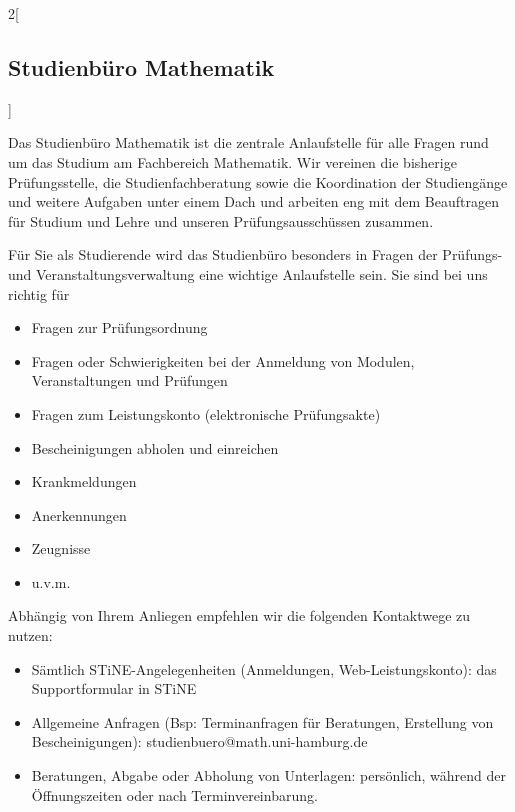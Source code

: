 \begin{multicols}{2}[\subsection{Studienbüro Mathematik}]

Das Studienbüro Mathematik ist die zentrale Anlaufstelle für alle Fragen rund
um das Studium am Fachbereich Mathematik. Wir vereinen die bisherige
Prüfungsstelle, die Studienfachberatung sowie die Koordination der Studiengänge
und weitere Aufgaben unter einem Dach und arbeiten eng mit dem Beauftragen für
Studium und Lehre und unseren Prüfungsausschüssen zusammen. 

Für Sie als Studierende wird das Studienbüro besonders in Fragen der Prüfungs-
und Veranstaltungsverwaltung eine wichtige Anlaufstelle sein. Sie sind bei uns
richtig für

\begin{itemize}\itemsep 0pt
    \item Fragen zur Prüfungsordnung 
    \item Fragen oder Schwierigkeiten bei der Anmeldung von Modulen,
          Veranstaltungen und Prüfungen
    \item Fragen zum Leistungskonto (elektronische Prüfungsakte)
    \item Bescheinigungen abholen und einreichen
    \item Krankmeldungen
    \item Anerkennungen
    \item Zeugnisse
    \item u.v.m.
\end{itemize}

Abhängig von Ihrem Anliegen empfehlen wir die folgenden Kontaktwege zu nutzen:

\begin{itemize}\itemsep 0pt
    \item Sämtlich STiNE-Angelegenheiten (Anmeldungen,
          Web-Leistungskonto): das Supportformular in STiNE
    \item Allgemeine Anfragen (Bsp: Terminanfragen für Beratungen, Erstellung
          von Bescheinigungen): studienbuero@math.uni-hamburg.de
    \item Beratungen, Abgabe oder Abholung von Unterlagen: persönlich, während
          der Öffnungszeiten oder nach Terminvereinbarung. 
\end{itemize}

\columnbreak


\end{multicols}
